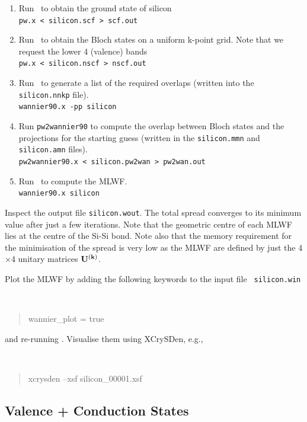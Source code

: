 \documentclass[a4paper,11pt,twoside]{article}
\begin{document}
\begin{enumerate}
\item Run \pwscf\ to obtain the ground state of silicon\\
{\tt pw.x < silicon.scf > scf.out}

\item Run \pwscf\ to obtain the Bloch states on a uniform k-point
  grid. Note that we request the lower 4 (valence) bands\\ 
{\tt pw.x < silicon.nscf > nscf.out}

\item Run \wannier\ to generate a list of the required overlaps (written
  into the {\tt silicon.nnkp} file).\\
{\tt wannier90.x -pp silicon}

\item Run {\tt pw2wannier90} to compute the overlap between Bloch
  states and the projections for the starting guess (written in the
  {\tt silicon.mmn} and {\tt  silicon.amn} files).\\
{\tt pw2wannier90.x < silicon.pw2wan > pw2wan.out}

\item Run \wannier\ to compute the MLWF.\\
{\tt wannier90.x silicon}

\end{enumerate}

Inspect the output file {\tt silicon.wout}. The total spread converges to its
minimum value after just a few iterations. Note that the geometric centre of
each MLWF lies at the centre of the Si-Si bond.
Note also that the memory requirement for the minimisation of
the spread is very low as the MLWF are defined 
by just the 4$\times$4 unitary matrices $\mathbf{U}^{(\mathbf{k})}$. 

Plot the MLWF by adding the following keywords to the input file {\tt
  silicon.win} 
{\tt
\begin{quote}
wannier\_plot = true
\end{quote} }
and re-running \wannier. Visualise them using XCrySDen, e.g.,
{\tt
\begin{quote}
xcrysden --xsf silicon\_00001.xsf
\end{quote} }

\subsection*{Valence + Conduction States}
\end{document}
